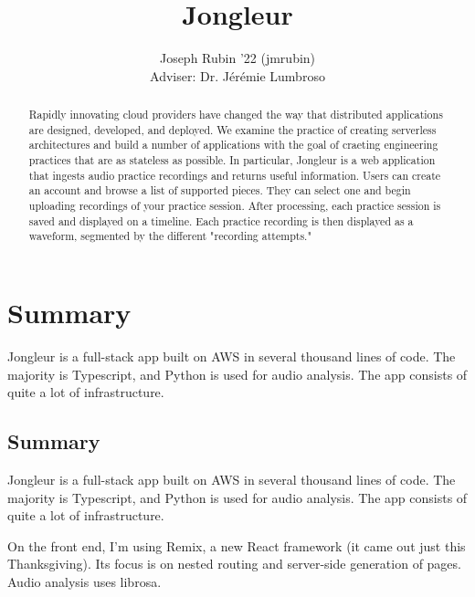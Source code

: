 \documentclass{article}
\begin{document}
\title{Jongleur}

\author{Joseph Rubin '22 (jmrubin)
\\Adviser: Dr. Jérémie Lumbroso}

\date{}
\maketitle

\thispagestyle{empty}


\begin{abstract}
    Rapidly innovating cloud providers have changed the way that distributed applications are designed, developed, and deployed.
    We examine the practice of creating serverless architectures and build a number of applications with the goal of craeting engineering practices that are as stateless as possible.
    In particular, Jongleur is a web application that ingests audio practice recordings and returns useful information.
    Users can create an account and browse a list of supported pieces.
    They can select one and begin uploading recordings of your practice session.
    After processing, each practice session is saved and displayed on a timeline.
    Each practice recording is then displayed as a waveform, segmented by the different "recording attempts."
\end{abstract}

\section{Summary}

Jongleur is a full-stack app built on AWS in several thousand lines of code.
The majority is Typescript, and Python is used for audio analysis.
The app consists of quite a lot of infrastructure.

\newpage

\subsection{Summary}
Jongleur is a full-stack app built on AWS in several thousand lines of code.
The majority is Typescript, and Python is used for audio analysis.
The app consists of quite a lot of infrastructure.

On the front end, I'm using Remix, a new React framework (it came out just this Thanksgiving).
Its focus is on nested routing and server-side generation of pages.
Audio analysis uses librosa.
\end{document}
